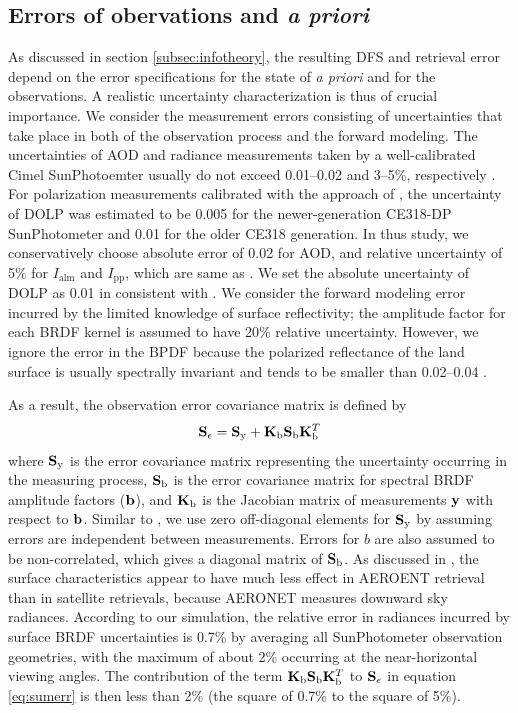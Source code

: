 \subsection{Errors of obervations and \textit{a priori}}

As discussed in section \ref{subsec:infotheory}, the resulting 
DFS and retrieval error depend on the error specifications for the state 
of \textit{a priori} and for the observations. A realistic uncertainty
characterization is thus of crucial importance. 
We consider the measurement errors consisting of uncertainties that 
take place in both of the observation process and the
forward modeling. The uncertainties of AOD and radiance measurements
taken by a well-calibrated Cimel SunPhotoemter usually do not exceed
0.01--0.02 and 3--5\%, respectively \citep{Holben98,Holben06,Li08}.
For polarization measurements calibrated with the approach of
\citet{Li10}, the uncertainty of DOLP was estimated to be 0.005 for the
newer-generation CE318-DP SunPhotometer and 0.01 for the older CE318
generation. In thus study, we conservatively choose absolute error of
0.02 for AOD, and relative uncertainty of 5\% for $I_\text{alm}$ and
$I_\text{pp}$, which are same as \citet{Dubovik00b}. We set the absolute
uncertainty of DOLP as 0.01 in consistent with \citet{Li09,Waquet09}.
We consider the forward modeling error incurred by the limited
knowledge of surface reflectivity; the amplitude factor for each BRDF
kernel is assumed to have 20\% relative uncertainty. However, we ignore the
error in the BPDF because the polarized reflectance of the land surface is
usually spectrally invariant and tends to be smaller than 0.02--0.04
\citep{Nadal99, Maignan09}.

As a result, the observation error covariance matrix is defined by
\begin{equation}
\mathbf{S}_{\epsilon}=\mathbf{S}_\text{y}+\mathbf{K}_\text{b}\mathbf{S}_\text{b}\mathbf{K}_\text{b}^T
\label{eq:sumerr}
\end{equation}
where $\mathbf{S}_\text{y}$ is the error covariance matrix representing the uncertainty
occurring in the measuring process, $\mathbf{S}_\text{b}$ is the error covariance matrix
for spectral BRDF amplitude factors ($\mathbf{b}$), and $\mathbf{K}_\text{b}$ is the Jacobian
matrix of measurements $\mathbf{y}$ with respect to $\mathbf{b}$. Similar to 
\citet{Dubovik00b}, we use zero off-diagonal elements for $\mathbf{S}_\text{y}$ by
assuming errors are independent between measurements. Errors for $b$ are also
assumed to be non-correlated, which gives a diagonal matrix of
$\mathbf{S}_\text{b}$. As discussed in \citet{Dubovik00b}, the surface characteristics
appear to have much less effect in AEROENT retrieval than in 
satellite retrievals, because AERONET measures downward sky radiances.
According to our simulation, the relative error in radiances incurred by
surface BRDF uncertainties is 0.7\% by averaging all SunPhotometer
observation geometries, with the maximum of about 2\% occurring at the
near-horizontal viewing angles. The contribution of the term
$\mathbf{K}_\text{b}\mathbf{S}_\text{b}\mathbf{K}_\text{b}^T$ to $\mathbf{S}_{\epsilon}$
in equation \eqref{eq:sumerr} is then less than 2\% (the square of 0.7\% to
the square of 5\%).


